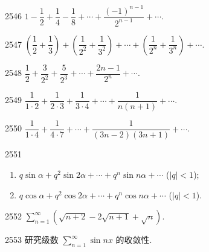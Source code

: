 


\begin{prob}[S]{2546}
$1 - \dfrac{1}{2} + \dfrac{1}{4} - \dfrac{1}{8} + \cdots + \dfrac{(-1)^{n-1}}{2^{n-1}} + \cdots$.
\end{prob}

\begin{prob}[S]{2547}
$\left(\dfrac{1}{2} + \dfrac{1}{3}\right) + \left(\dfrac{1}{2^2} + \dfrac{1}{3^2}\right) + \cdots + \left(\dfrac{1}{2^n} + \dfrac{1}{3^n}\right) + \cdots$.
\end{prob}

\begin{prob}[S]{2548}
$\dfrac{1}{2} + \dfrac{3}{2^2} + \dfrac{5}{2^3} + \cdots + \dfrac{2n - 1}{2^n} + \cdots$.
\end{prob}

\begin{prob}[S]{2549}
$\dfrac{1}{1 \cdot 2} + \dfrac{1}{2 \cdot 3} + \dfrac{1}{3 \cdot 4} + \cdots + \dfrac{1}{n(n+1)} + \cdots$.
\end{prob}

\begin{prob}[S]{2550}
$\dfrac{1}{1 \cdot 4} + \dfrac{1}{4 \cdot 7} + \cdots + \dfrac{1}{(3n - 2)(3n + 1)} + \cdots$.
\end{prob}

\begin{prob}[M]{2551}
\begin{enumerate}[label=(\alph*), itemsep=2pt, topsep=3pt]
  \item $q\sin\alpha + q^2\sin 2\alpha + \cdots + q^n\sin n\alpha + \cdots$ ($|q| < 1$);
  \item $q\cos\alpha + q^2\cos 2\alpha + \cdots + q^n\cos n\alpha + \cdots$ ($|q| < 1$).
\end{enumerate}
\end{prob}

\begin{prob}[S]{2552}
$\sum_{n=1}^{\infty} (\sqrt{n+2} - 2\sqrt{n+1} + \sqrt{n})$.
\end{prob}

\begin{prob}[M]{2553}
研究级数 $\sum_{n=1}^{\infty} \sin nx$ 的收敛性.
\end{prob}

